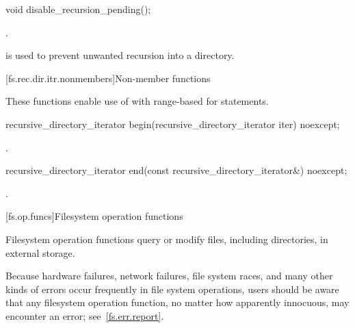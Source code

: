 %
\begin{itemdecl}
void disable_recursion_pending();
\end{itemdecl}

\begin{itemdescr}
\pnum
\ensures
{}.

\pnum
\begin{note}
\tcode{()} is used to prevent
  unwanted recursion into a directory.
\end{note}
\end{itemdescr}

[fs.rec.dir.itr.nonmembers]{Non-member functions}

\pnum
These functions enable use of 
with range-based for statements.

%
\begin{itemdecl}
recursive_directory_iterator begin(recursive_directory_iterator iter) noexcept;
\end{itemdecl}

\begin{itemdescr}
\pnum
\returns
{}.
\end{itemdescr}

%
\begin{itemdecl}
recursive_directory_iterator end(const recursive_directory_iterator&) noexcept;
\end{itemdecl}

\begin{itemdescr}
\pnum
\returns
{}.
\end{itemdescr}

[fs.op.funcs]{Filesystem operation functions}

\pnum
Filesystem operation functions query or modify files, including directories,
in external storage.

\pnum
\begin{note}
Because hardware failures, network failures, file system races,
and many other kinds of errors occur frequently in file system operations, users should be aware
that any filesystem operation function, no matter how apparently innocuous, may encounter
an error; see~\ref{fs.err.report}.
\end{note}

